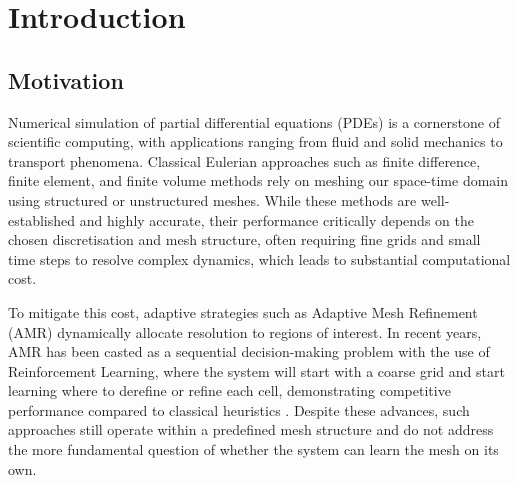 \documentclass[12pt, a4paper, twoside]{report}
\theoremstyle{plain}
\theoremstyle{definition}
\begin{document}
\newpage

\tableofcontents
\newpage
\listoffigures
\newpage
\chapter{Introduction}
\label{chap:intro}
\label{sec:motivation}
\section{Motivation}

Numerical simulation of partial differential equations (PDEs) is a cornerstone of scientific computing, with applications ranging from fluid and solid mechanics to transport phenomena. Classical Eulerian approaches such as finite difference, finite element, and finite volume methods rely on meshing our space-time domain using structured or unstructured meshes. 
While these methods are well-established and highly accurate, their performance critically depends on the chosen discretisation and mesh structure, often requiring fine grids and small time steps to resolve complex dynamics, which leads to substantial computational cost.

To mitigate this cost, adaptive strategies such as Adaptive Mesh Refinement (AMR) dynamically allocate resolution to regions of interest\cite{plewa2005}. In recent years, AMR has been casted as a sequential decision-making problem with the use of Reinforcement Learning, where the system will start with a coarse grid and start learning where to derefine or refine each cell, demonstrating competitive performance compared to classical heuristics \cite{yang2021rl_amr, FOUCART23}. Despite these advances, such approaches still operate within a predefined mesh structure and do not address the more fundamental question of whether the system can learn the mesh on its own.
\end{document}
